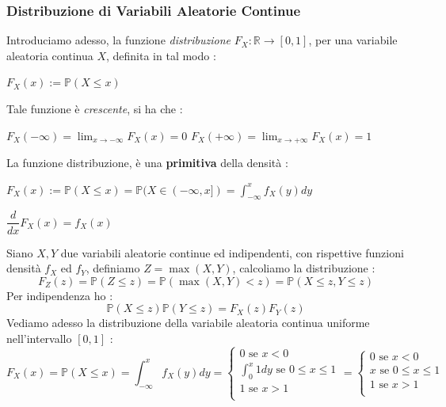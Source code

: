 \documentclass[12pt, letterpaper]{article}
\newcommand{\R}{{\mathbb R}}
\newcommand{\Prob}{{\mathbb P}}
\begin{document}
\subsubsection{Distribuzione di Variabili Aleatorie Continue}
Introduciamo adesso, la funzione \textit{distribuzione} \(F_X:\R\rightarrow[0,1]\), per una variabile aleatoria  continua \(X\), 
definita in tal modo : \begin{center}
    \(F_X(x):=\Prob(X\le x)\)
\end{center}
Tale funzione è \textit{crescente}, si ha che :\begin{center}
    \(F_X(-\infty)=\displaystyle\lim_{x\rightarrow -\infty}F_X(x)=0\)\hphantom{text}
    \(F_X(+\infty)=\displaystyle\lim_{x\rightarrow +\infty}F_X(x)=1\)
\end{center}
La funzione distribuzione, è una \textbf{primitiva} della densità :\begin{center}
    \(F_X(x):=\Prob(X\le x)=\Prob(X\in(-\infty,x])=\displaystyle\int_{-\infty}^x f_X(y)dy\)
\end{center}\begin{center}
    \(\dfrac{d}{dx}F_X(x)=f_X(x)\)
\end{center}
Siano \(X,Y\) due variabili aleatorie continue ed indipendenti, con rispettive 
funzioni densità \(f_X\) ed \(f_Y\), definiamo \(Z=\max(X,Y)\), calcoliamo la distribuzione :
\begin{equation}
    F_Z(z)=\Prob(Z\le z)=\Prob(\max(X,Y)<z)=\Prob(X\le z, Y\le z) 
\end{equation} Per indipendenza ho :\begin{equation}
    \Prob(X\le z)\Prob( Y\le z) =F_X(z)F_Y(z)
\end{equation}
Vediamo adesso la distribuzione della variabile aleatoria continua uniforme nell’intervallo \([0, 1]\) :\begin{equation}
    F_X(x)=\Prob(X\le x)=\int_{-\infty}^x f_X(y)dy=\begin{cases}
        0\text{ se }x<0\\
        \int_0^x 1dy\text{ se }0\le x\le 1\\
        1\text{ se }x>1\\
    \end{cases}=\begin{cases}
        0\text{ se }x<0\\
        x\text{ se }0\le x\le 1\\
        1\text{ se }x>1\\
    \end{cases}
\end{equation}
\begin{figure}[h]
\end{figure}
\end{document}
